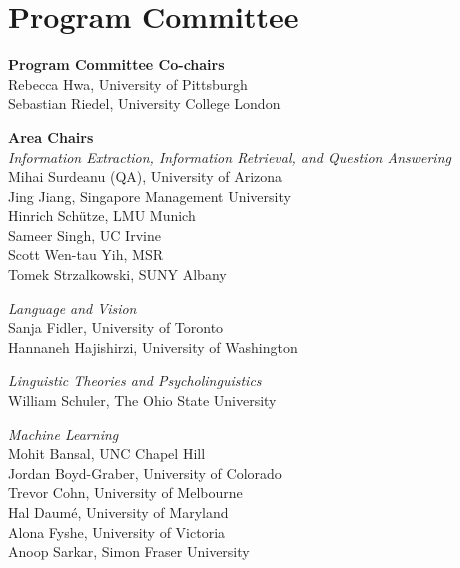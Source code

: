 
\clearpage
\section{Program Committee}
\setlength{\parindent}{0pt}

\vspace*{0.5cm}

{\bf Program Committee Co-chairs} \\
Rebecca Hwa, University of Pittsburgh \\
Sebastian Riedel, University College London

{\bf Area Chairs} \\

\emph{Information Extraction, Information Retrieval, and Question Answering} \\
\hspace*{0.2in} Mihai Surdeanu (QA), University of Arizona \\
\hspace*{0.2in} Jing Jiang, Singapore Management University \\
\hspace*{0.2in} Hinrich Schütze, LMU Munich \\
\hspace*{0.2in} Sameer Singh, UC Irvine \\
\hspace*{0.2in} Scott Wen-tau Yih, MSR \\
\hspace*{0.2in} Tomek Strzalkowski, SUNY Albany

\emph{Language and Vision} \\
\hspace*{0.2in} Sanja Fidler, University of Toronto \\
\hspace*{0.2in} Hannaneh Hajishirzi, University of Washington


\emph{Linguistic Theories and Psycholinguistics} \\
\hspace*{0.2in} William Schuler, The Ohio State University

\emph{Machine Learning} \\
\hspace*{0.2in} Mohit Bansal, UNC Chapel Hill \\
\hspace*{0.2in} Jordan Boyd-Graber, University of Colorado \\
\hspace*{0.2in} Trevor Cohn, University of Melbourne\\
\hspace*{0.2in} Hal Daumé, University of Maryland \\
\hspace*{0.2in} Alona Fyshe, University of Victoria \\
\hspace*{0.2in} Anoop Sarkar, Simon Fraser University


